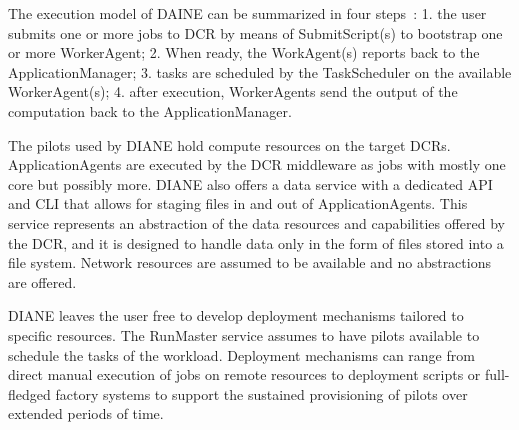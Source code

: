 \documentclass{sig-alternate}
\begin{document}
The execution model of DAINE can be summarized in four
steps~\cite{moscicki2011understanding}: 1. the user submits one or more jobs to
DCR by means of SubmitScript(s) to bootstrap one or more WorkerAgent; 2. When
ready, the WorkAgent(s) reports back to the ApplicationManager; 3. tasks are
scheduled by the TaskScheduler on the available WorkerAgent(s); 4. after
execution, WorkerAgents send the output of the computation back to the
ApplicationManager.

 


The pilots used by DIANE hold compute resources on the target DCRs.
ApplicationAgents are executed by the DCR middleware as jobs with mostly one
core but possibly more. DIANE also offers a data service with a dedicated API
and CLI that allows for staging files in and out of ApplicationAgents. This
service represents an abstraction of the data resources and capabilities offered
by the DCR, and it is designed to handle data only in the form of files stored
into a file system. Network resources are assumed to be available and no
abstractions are offered.


DIANE leaves the user free to develop deployment mechanisms tailored to specific
resources. The RunMaster service assumes to have pilots available to schedule
the tasks of the workload. Deployment mechanisms can range from direct manual
execution of jobs on remote resources to deployment scripts or full-fledged
factory systems to support the sustained provisioning of pilots over extended
periods of time.
\end{document}
